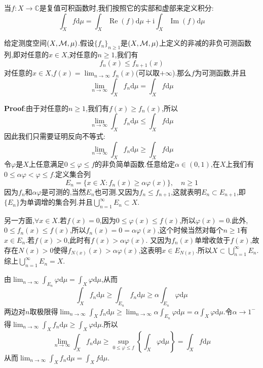 \qquad 当$f:X\to \mathbb{C}$是复值可积函数时,我们按照它的实部和虚部来定义积分:
$$
\int_X f\mathrm{d}\mu=\int_X \operatorname{Re}(f)\mathrm{d}\mu+\mathrm{i}\int_X \operatorname{Im}(f)\mathrm{d}\mu
$$
\begin{tcolorbox}[colback=KuangNei,colframe=BianKuang,title=\textbf{Beppo Levi定理},sharpish corners]
    给定测度空间$(X,\mathcal{M},\mu)$.假设$\{f_n\}_{n\geqslant 1}$是$(X,\mathcal{M},\mu)$上定义的非减的非负可测函数列,即对任意的$x\in X$,对任意的$n\geqslant 1$,我们有
    $$
    f_n(x)\leqslant f_{n+1}(x)
    $$
    对任意的$x\in X$,$f(x)=\lim_{n\to \infty}f_n(x)$(可以取$+\infty$).那么$f$为可测函数,并且
    $$
    \lim_{n\to \infty}\int_X f_n\mathrm{d}\mu=\int_X f\mathrm{d}\mu
    $$
\end{tcolorbox}
\textbf{Proof}:由于对任意的$n\geqslant 1$,我们有$f(x)\geqslant f_n(x)$,所以
$$
\lim_{n\to \infty}\int_X f_n\mathrm{d}\mu\leqslant \int_X f\mathrm{d}\mu
$$
因此我们只需要证明反向不等式:
$$
\lim_{n\to \infty}\int_X f_n\mathrm{d}\mu\geqslant \int_X f\mathrm{d}\mu
$$
令$\varphi$是$X$上任意满足$0\leqslant\varphi\leqslant f$的非负简单函数.任意给定$\alpha\in (0,1)$,在$X$上我们有$0\leqslant\alpha\varphi<\varphi\leqslant f$.定义集合列
$$
E_n=\{x\in X:f_n(x)\geqslant \alpha\varphi(x)\},\quad n\geqslant 1
$$
因为$f_n$和$\alpha\varphi$是可测的,当然$E_n$也可测.又因为$f_n\leqslant f_{n+1}$,这就表明$E_n\subset E_{n+1}$,即$\{E_n\}$为单调增的集合列.并且$\bigcup^{\infty}_{n=1}E_n\subset X$.\par
另一方面,$\forall x\in X$.若$f(x)=0$,因为$0\leqslant\varphi(x)\leqslant f(x)$,所以$\varphi(x)=0$.此外,$0\leqslant f_n(x)\leqslant f(x)$,所以$f_n(x)=0=\alpha\varphi(x)$,这个时候当然对每个$n\geqslant 1$有$x\in E_n$.若$f(x)>0$,此时有$f(x)>\alpha\varphi(x)$.
又因为$f_n(x)$单增收敛于$f(x)$,故存在$N(x)>0$使得$f_{N(x)}(x)>\alpha\varphi(x)$,这表明$x\in E_{N(x)}$.所以$X\subset \bigcup^{\infty}_{n=1}E_n$.综上$\bigcup^{\infty}_{n=1}E_n= X$.\par
由$\lim_{n\to\infty}\int_{E_n}\varphi\mathrm{d}\mu=\int_{X}\varphi\mathrm{d}\mu$,从而
$$
\int_{X}f_n\mathrm{d}\mu\geqslant \int_{E_n}f_n\mathrm{d}\mu\geqslant \alpha\int_{E_n}\varphi\mathrm{d}\mu
$$
两边对$n$取极限得$\lim_{n\to\infty}\int_{X}f_n\mathrm{d}\mu\geqslant \lim_{n\to\infty}\alpha\int_{E_n}\varphi\mathrm{d}\mu=\alpha\int_{X}\varphi\mathrm{d}\mu$.令$\alpha\to 1^{-}$得$\lim_{n\to\infty}\int_{X}f_n\mathrm{d}\mu\geqslant \int_{X}\varphi\mathrm{d}\mu$.所以
$$
\lim_{n\to\infty}\int_{X}f_n\mathrm{d}\mu\geqslant \sup_{0\leqslant \varphi\leqslant f}\left\{\int_X \varphi\mathrm{d}\mu\right\}=\int_X f\mathrm{d}\mu
$$
从而$\lim_{n\to \infty}\int_X f_n\mathrm{d}\mu=\int_X f\mathrm{d}\mu$.
